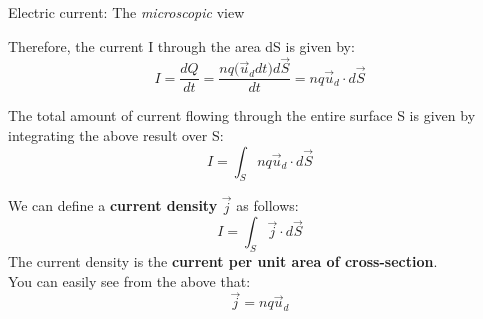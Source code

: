 \begin{frame}{Electric current: The {\em microscopic} view }

Therefore, the current I through the area dS is given by:
\begin{equation*}
  I = \frac{dQ}{dt} = \frac{n q \Big( \vec{u}_{d} dt \Big)
    d\vec{S}}{dt} = n q \vec{u}_{d} \cdot d\vec{S}
\end{equation*}

The total amount of current flowing through the entire surface S
is given by integrating the above result over S:
\begin{equation*}
  I = \int_{S} n q \vec{u}_{d} \cdot d\vec{S}
\end{equation*}

We can define a {\bf current density} $\vec{j}$ as follows:
\begin{equation*}
  I = \int_{S} \vec{j} \cdot d\vec{S}
\end{equation*}
The  current density is the {\bf current per unit area  of cross-section}.\\

You can easily see from the above that:
\begin{equation*}
  \vec{j} = n q \vec{u}_{d}
\end{equation*}

\end{frame}

%
%
%

